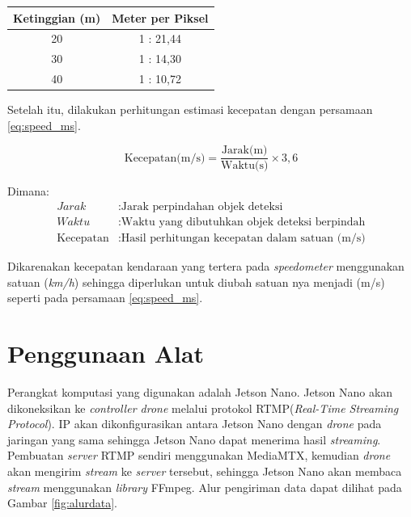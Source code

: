 \begin{table}[h!]
  \centering
  \label{tbl:skala_ppm}
  \begin{tabular}{|c|c|}
    \hline
    \rowcolor[gray]{0.9}
    \textbf{Ketinggian (m)} & \textbf{Meter per Piksel} \\ \hline
    20                      & 1 : 21,44                 \\ \hline
    30                      & 1 : 14,30                 \\ \hline
    40                      & 1 : 10,72                 \\ \hline
  \end{tabular}
\end{table}

Setelah itu, dilakukan perhitungan estimasi kecepatan dengan persamaan \ref{eq:speed_ms}.

\begin{equation}
  \label{eq:speed_ms}
  \text{Kecepatan(m/s)} = \frac{\text{Jarak(m)}}{\text{Waktu(s)}} \times 3{,}6
\end{equation}

\begin{flushleft}
Dimana:
\begin{align*}
Jarak & : \text{Jarak perpindahan objek deteksi} \\
Waktu & : \text{Waktu yang dibutuhkan objek deteksi berpindah} \\
\text{Kecepatan} & : \text{Hasil perhitungan kecepatan dalam satuan (m/s)}
\end{align*}
\end{flushleft}

Dikarenakan kecepatan kendaraan yang tertera pada \emph{speedometer} menggunakan satuan (\emph{km/h}) sehingga diperlukan untuk diubah satuan nya menjadi (m/s) seperti pada persamaan \ref{eq:speed_ms}.

\section{Penggunaan Alat}
Perangkat komputasi yang digunakan adalah Jetson Nano. Jetson Nano akan dikoneksikan ke \emph{controller drone} melalui protokol RTMP(\emph{Real-Time Streaming Protocol}). IP akan dikonfigurasikan antara Jetson Nano dengan \emph{drone} pada jaringan yang sama sehingga Jetson Nano dapat menerima hasil \emph{streaming}. Pembuatan \emph{server} RTMP sendiri menggunakan MediaMTX, kemudian \emph{drone} akan mengirim \emph{stream} ke \emph{server} tersebut, sehingga Jetson Nano akan membaca \emph{stream} menggunakan \emph{library} FFmpeg. Alur pengiriman data dapat dilihat pada Gambar \ref{fig:alurdata}.

